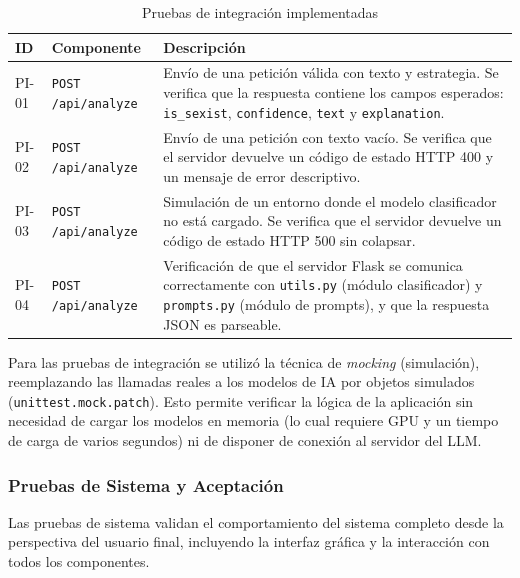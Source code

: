 \begin{table}[H]
\centering
\caption{Pruebas de integración implementadas}
\label{tab:pruebas-integracion}
\begin{tabular}{|l|p{4cm}|p{5.5cm}|}
\hline
\textbf{ID} & \textbf{Componente} & \textbf{Descripción} \\ \hline

PI-01 & \texttt{POST /api/analyze} & Envío de una petición válida con texto y estrategia. Se verifica que la respuesta contiene los campos esperados: \texttt{is\_sexist}, \texttt{confidence}, \texttt{text} y \texttt{explanation}. \\ \hline

PI-02 & \texttt{POST /api/analyze} & Envío de una petición con texto vacío. Se verifica que el servidor devuelve un código de estado HTTP 400 y un mensaje de error descriptivo. \\ \hline

PI-03 & \texttt{POST /api/analyze} & Simulación de un entorno donde el modelo clasificador no está cargado. Se verifica que el servidor devuelve un código de estado HTTP 500 sin colapsar. \\ \hline

PI-04 & \texttt{POST /api/analyze} & Verificación de que el servidor Flask se comunica correctamente con \texttt{utils.py} (módulo clasificador) y \texttt{prompts.py} (módulo de prompts), y que la respuesta JSON es parseable. \\ \hline

\end{tabular}
\end{table}

Para las pruebas de integración se utilizó la técnica de \textit{mocking} (simulación), reemplazando las llamadas reales a los modelos de IA por objetos simulados (\texttt{unittest.mock.patch}). Esto permite verificar la lógica de la aplicación sin necesidad de cargar los modelos en memoria (lo cual requiere GPU y un tiempo de carga de varios segundos) ni de disponer de conexión al servidor del LLM.

\subsubsection{Pruebas de Sistema y Aceptación}

Las pruebas de sistema validan el comportamiento del sistema completo desde la perspectiva del usuario final, incluyendo la interfaz gráfica y la interacción con todos los componentes.

